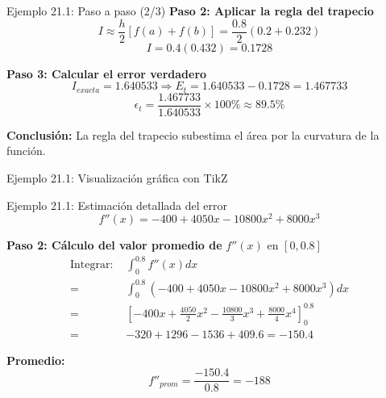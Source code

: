 \documentclass[main.tex]{subfiles}
\begin{document}
\begin{frame}{Ejemplo 21.1: Paso a paso (2/3)}
\textbf{Paso 2: Aplicar la regla del trapecio}
\[ I \approx \frac{h}{2} [f(a) + f(b)] = \frac{0.8}{2} (0.2 + 0.232) \]
\[ I = 0.4 (0.432) = 0.1728 \]

\textbf{Paso 3: Calcular el error verdadero}
\[ I_{exacta} = 1.640533 \Rightarrow E_t = 1.640533 - 0.1728 = 1.467733 \]
\[ \epsilon_t = \frac{1.467733}{1.640533} \times 100\% \approx 89.5\% \]

\textbf{Conclusión:} La regla del trapecio subestima el área por la curvatura de la función.
\end{frame}

\begin{frame}{Ejemplo 21.1: Visualización gráfica con TikZ}
\begin{center}
\end{center}
\end{frame}

\begin{frame}{Ejemplo 21.1: Estimación detallada del error}
\[ f''(x) = -400 + 4050x - 10800x^2 + 8000x^3 \]

\textbf{Paso 2: Cálculo del valor promedio de } \( f''(x) \) en \( [0, 0.8] \)
\begin{align*}
\text{Integrar: } & \int_0^{0.8} f''(x) dx \\
=\ & \int_0^{0.8} \left(-400 + 4050x - 10800x^2 + 8000x^3\right) dx \\
=\ & \left[-400x + \frac{4050}{2}x^2 - \frac{10800}{3}x^3 + \frac{8000}{4}x^4\right]_0^{0.8} \\
=\ & -320 + 1296 - 1536 + 409.6 = -150.4
\end{align*}

\textbf{Promedio:}
\[ f''_{prom} = \frac{-150.4}{0.8} = -188 \]
\end{frame}
\end{document}
